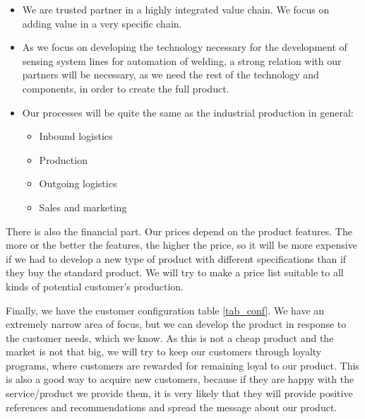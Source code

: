 \begin{itemize}
\item We are trusted partner in a highly integrated value chain. We focus on adding value in a very specific chain.
\item As we focus on developing the technology necessary for the development of sensing system lines for automation of welding, a strong relation with our partners will be necessary, as we need the rest of the technology and components, in order to create the full product.
\item Our processes will be quite the same as the industrial production in general:
\begin{itemize}
\item Inbound logistics
\item Production
\item Outgoing logistics
\item Sales and marketing
\end{itemize}
\end{itemize}

There is also the financial part. 
Our prices depend on the product features. 
The more or the better the features, the higher the price, so it will be more expensive if we had to develop a new type of product with different specifications than if they buy the standard product. We will try to make a price list suitable to all kinds of potential customer's production.

Finally, we have the customer configuration table \ref{tab_conf}. 
We have an extremely narrow area of focus, but we can develop the product in response to the customer needs, which we know. 
As this is not a cheap product and the market is not that big, we will try to keep our customers through loyalty programs, where customers are rewarded for remaining loyal to our product. 
This is also a good way to acquire new customers, because if they are happy with the service/product we provide them, it is very likely that they will provide positive references and recommendations and spread the message about our product.

